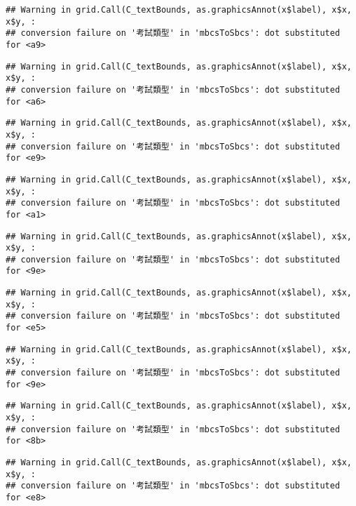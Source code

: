\documentclass[
]{book}
\begin{document}
\begin{verbatim}
## Warning in grid.Call(C_textBounds, as.graphicsAnnot(x$label), x$x, x$y, :
## conversion failure on '考試類型' in 'mbcsToSbcs': dot substituted for <a9>
\end{verbatim}

\begin{verbatim}
## Warning in grid.Call(C_textBounds, as.graphicsAnnot(x$label), x$x, x$y, :
## conversion failure on '考試類型' in 'mbcsToSbcs': dot substituted for <a6>
\end{verbatim}

\begin{verbatim}
## Warning in grid.Call(C_textBounds, as.graphicsAnnot(x$label), x$x, x$y, :
## conversion failure on '考試類型' in 'mbcsToSbcs': dot substituted for <e9>
\end{verbatim}

\begin{verbatim}
## Warning in grid.Call(C_textBounds, as.graphicsAnnot(x$label), x$x, x$y, :
## conversion failure on '考試類型' in 'mbcsToSbcs': dot substituted for <a1>
\end{verbatim}

\begin{verbatim}
## Warning in grid.Call(C_textBounds, as.graphicsAnnot(x$label), x$x, x$y, :
## conversion failure on '考試類型' in 'mbcsToSbcs': dot substituted for <9e>
\end{verbatim}

\begin{verbatim}
## Warning in grid.Call(C_textBounds, as.graphicsAnnot(x$label), x$x, x$y, :
## conversion failure on '考試類型' in 'mbcsToSbcs': dot substituted for <e5>
\end{verbatim}

\begin{verbatim}
## Warning in grid.Call(C_textBounds, as.graphicsAnnot(x$label), x$x, x$y, :
## conversion failure on '考試類型' in 'mbcsToSbcs': dot substituted for <9e>
\end{verbatim}

\begin{verbatim}
## Warning in grid.Call(C_textBounds, as.graphicsAnnot(x$label), x$x, x$y, :
## conversion failure on '考試類型' in 'mbcsToSbcs': dot substituted for <8b>
\end{verbatim}

\begin{verbatim}
## Warning in grid.Call(C_textBounds, as.graphicsAnnot(x$label), x$x, x$y, :
## conversion failure on '考試類型' in 'mbcsToSbcs': dot substituted for <e8>
\end{verbatim}
\end{document}
